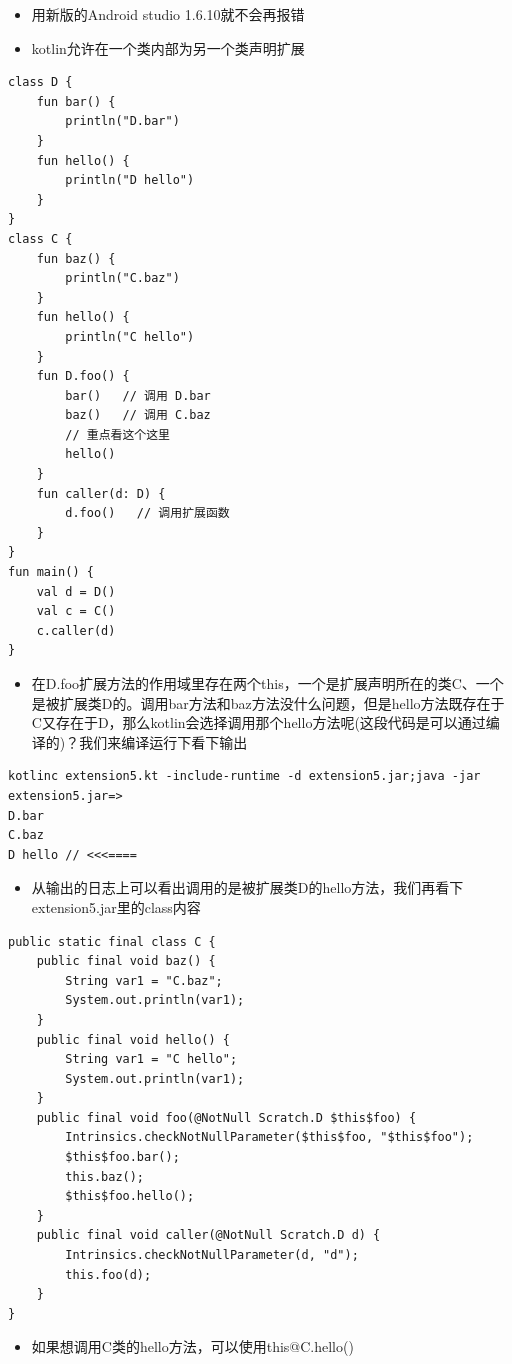 \documentclass[9pt, b5paper]{article}
\begin{document}
\begin{itemize}
\item 用新版的Android studio 1.6.10就不会再报错
\item kotlin允许在一个类内部为另一个类声明扩展
\end{itemize}
\begin{verbatim}
class D {
    fun bar() {
        println("D.bar")
    }
    fun hello() {
        println("D hello")
    }
}
class C {
    fun baz() {
        println("C.baz")    
    }
    fun hello() {
        println("C hello")
    }
    fun D.foo() {
        bar()   // 调用 D.bar
        baz()   // 调用 C.baz
        // 重点看这个这里
        hello()
    }
    fun caller(d: D) {
        d.foo()   // 调用扩展函数
    }
}
fun main() {
    val d = D()
    val c = C()
    c.caller(d)
}
\end{verbatim}
\begin{itemize}
\item 在D.foo扩展方法的作用域里存在两个this，一个是扩展声明所在的类C、一个是被扩展类D的。调用bar方法和baz方法没什么问题，但是hello方法既存在于C又存在于D，那么kotlin会选择调用那个hello方法呢(这段代码是可以通过编译的)？我们来编译运行下看下输出
\end{itemize}
\begin{verbatim}
kotlinc extension5.kt -include-runtime -d extension5.jar;java -jar extension5.jar=>
D.bar
C.baz
D hello // <<<====
\end{verbatim}
\begin{itemize}
\item 从输出的日志上可以看出调用的是被扩展类D的hello方法，我们再看下extension5.jar里的class内容
\end{itemize}
\begin{verbatim}
public static final class C {
    public final void baz() {
        String var1 = "C.baz";
        System.out.println(var1);
    }
    public final void hello() {
        String var1 = "C hello";
        System.out.println(var1);
    }
    public final void foo(@NotNull Scratch.D $this$foo) {
        Intrinsics.checkNotNullParameter($this$foo, "$this$foo");
        $this$foo.bar();
        this.baz();
        $this$foo.hello();
    }
    public final void caller(@NotNull Scratch.D d) {
        Intrinsics.checkNotNullParameter(d, "d");
        this.foo(d);
    }
}
\end{verbatim}
\begin{itemize}
\item 如果想调用C类的hello方法，可以使用this@C.hello()
\end{itemize}
\end{document}
